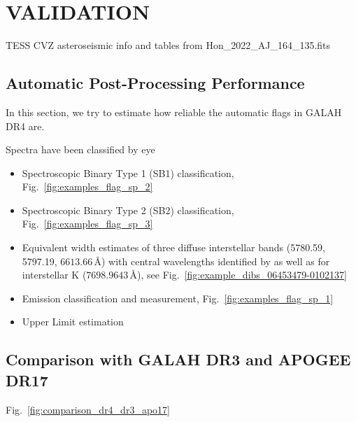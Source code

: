 \documentclass[
  journal=pasa,
  manuscript=research-paper, %
  year=2023,
  volume=37
]{cup-journal}
\begin{document}
\section{VALIDATION}
\label{sec:validation}

TESS CVZ asteroseismic info \citep{Hon2022} and tables from Hon\_2022\_AJ\_164\_135.fits

\subsection{Automatic Post-Processing Performance}

In this section, we try to estimate how reliable the automatic flags in GALAH DR4 are.

Spectra have been classified by eye

\begin{itemize}
    \item Spectroscopic Binary Type 1 (SB1) classification, Fig.~\ref{fig:examples_flag_sp_2}
    \item Spectroscopic Binary Type 2 (SB2) classification, Fig.~\ref{fig:examples_flag_sp_3}
    \item Equivalent width estimates of three diffuse interstellar bands (5780.59, 5797.19, $6613.66\,\text{\AA}$) with central wavelengths identified by \citet{Vogrincic2023} as well as for interstellar K ($7698.9643\,\text{\AA}$), see Fig.~\ref{fig:example_dibs_06453479-0102137}
    \item Emission classification and measurement, Fig.~\ref{fig:examples_flag_sp_1}
    \item Upper Limit estimation
\end{itemize}

\subsection{Comparison with GALAH DR3 and APOGEE DR17}

Fig.~\ref{fig:comparison_dr4_dr3_apo17}
\end{document}
